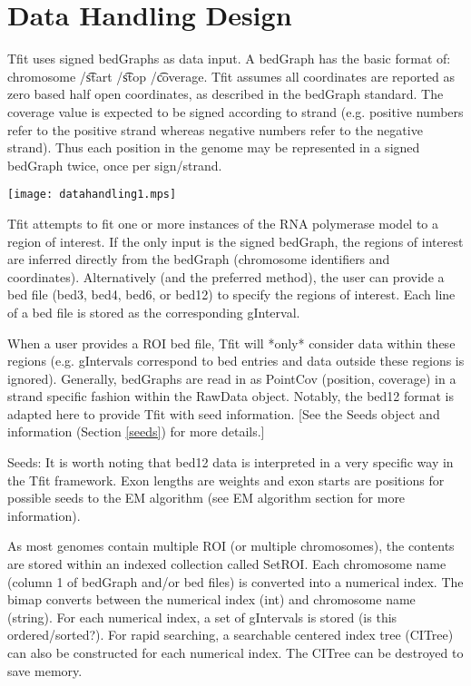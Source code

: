 \documentclass[11pt]{article}
\begin{document}
\section{Data Handling Design}
Tfit uses signed bedGraphs as data input.  A bedGraph has the basic format of: 
chromosome /\t start /\t stop /\t coverage.  Tfit assumes all coordinates are
reported as zero based half open coordinates, as described in the bedGraph 
standard.  
The coverage value is expected to be signed according to strand (e.g. positive 
numbers refer to the positive strand whereas negative numbers refer to the 
negative strand).  Thus each position in the genome may be represented in a 
signed bedGraph twice, once per sign/strand.

\texttt{[image: datahandling1.mps]}

Tfit attempts to fit one or more instances of the RNA polymerase model to a 
region of interest.  If the only input is the signed bedGraph, the regions of 
interest are inferred directly from the bedGraph (chromosome identifiers 
and coordinates).  Alternatively (and the preferred method), the user can 
provide a bed file (bed3, bed4, bed6, or bed12) to specify the regions of 
interest.  Each line of a bed file is stored as the corresponding gInterval.

When a user provides a ROI bed file, Tfit will *only* consider data within 
these regions (e.g. gIntervals correspond to bed entries and data outside these 
regions is ignored).  Generally, bedGraphs are read in as PointCov (position, 
coverage) in a strand specific fashion within the RawData object.  Notably,
the bed12 format is adapted here to provide Tfit with seed information.  [See
the Seeds object and information (Section \ref{seeds}) for more details.]

Seeds: It is worth noting that bed12 data is interpreted in a very specific way
in the Tfit framework.   Exon lengths are weights and exon starts are 
positions for possible seeds to the EM algorithm (see EM algorithm 
section for more information).

As most genomes contain multiple ROI (or multiple chromosomes), the contents
are stored within an indexed collection called SetROI.  Each chromosome name 
(column 1 of bedGraph and/or bed files) is converted into a numerical index.
The bimap converts between the numerical index (int) and chromosome name (string).
For each numerical index, a set of gIntervals is stored (is this ordered/sorted?). 
For rapid searching, a searchable centered index tree (CITree) can also be 
constructed for each numerical index.  The CITree can be destroyed to save 
memory.  
\end{document}
